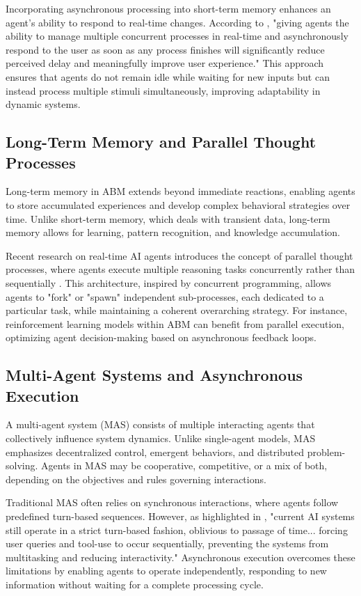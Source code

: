 Incorporating asynchronous processing into short-term memory enhances an agent’s ability to respond to real-time changes. According to \cite{10}, "giving agents the ability to manage multiple concurrent processes in real-time and asynchronously respond to the user as soon as any process finishes will significantly reduce perceived delay and meaningfully improve user experience." This approach ensures that agents do not remain idle while waiting for new inputs but can instead process multiple stimuli simultaneously, improving adaptability in dynamic systems.

\subsection{Long-Term Memory and Parallel Thought Processes}

Long-term memory in ABM extends beyond immediate reactions, enabling agents to store accumulated experiences and develop complex behavioral strategies over time. Unlike short-term memory, which deals with transient data, long-term memory allows for learning, pattern recognition, and knowledge accumulation.

Recent research on real-time AI agents introduces the concept of parallel thought processes, where agents execute multiple reasoning tasks concurrently rather than sequentially \cite{10}. This architecture, inspired by concurrent programming, allows agents to "fork" or "spawn" independent sub-processes, each dedicated to a particular task, while maintaining a coherent overarching strategy. For instance, reinforcement learning models within ABM can benefit from parallel execution, optimizing agent decision-making based on asynchronous feedback loops.

\subsection{Multi-Agent Systems and Asynchronous Execution}

A multi-agent system (MAS) consists of multiple interacting agents that collectively influence system dynamics. Unlike single-agent models, MAS emphasizes decentralized control, emergent behaviors, and distributed problem-solving. Agents in MAS may be cooperative, competitive, or a mix of both, depending on the objectives and rules governing interactions.

Traditional MAS often relies on synchronous interactions, where agents follow predefined turn-based sequences. However, as highlighted in \cite{10}, "current AI systems still operate in a strict turn-based fashion, oblivious to passage of time... forcing user queries and tool-use to occur sequentially, preventing the systems from multitasking and reducing interactivity." Asynchronous execution overcomes these limitations by enabling agents to operate independently, responding to new information without waiting for a complete processing cycle.

